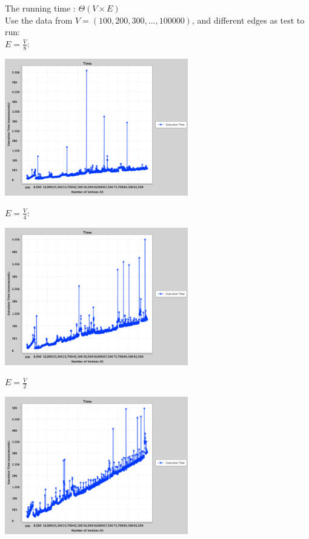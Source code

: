 \documentclass{article}
\begin{document}
\begin{enumerate}
    The running time : $\Theta(V \times E)$\\
    Use the data from $V = (100, 200, 300, ... , 100000)$, and different edges as test to run:\\
    $E = \frac{V}{8}$: 
                    \begin{center}
        \includegraphics[width=0.6\textwidth]{s1.png}
        \end{center}
    $E = \frac{V}{4}$: 
                    \begin{center}
        \includegraphics[width=0.6\textwidth]{s2.png}
        \end{center}
    $E = \frac{V}{2}$
                \begin{center}
        \includegraphics[width=0.6\textwidth]{s3.png}
        \end{center}

\end{enumerate}
\end{document}
